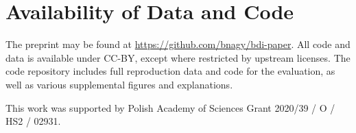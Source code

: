\documentclass[
    hf
]{ceurart}
\begin{document}
\section{Availability of Data and Code}\label{sec:data}

The preprint may be found at \url{https://github.com/bnagy/bdi-paper}. All code and data is
available under CC-BY, except where restricted by upstream licenses. The code repository includes
full reproduction data and code for the evaluation, as well as various supplemental figures and
explanations.

\FloatBarrier

\begin{acknowledgments}
    This work was supported by Polish Academy of Sciences Grant 2020/39 / O / HS2 / 02931.
\end{acknowledgments}

%
\printbibliography
\appendix
\onecolumn
\end{document}
